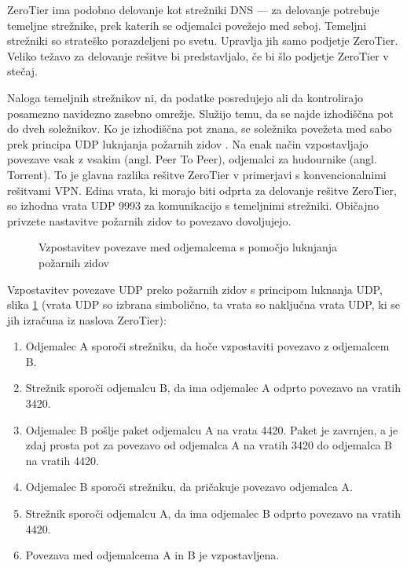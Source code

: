 \documentclass[a4paper, 12pt]{book}
\begin{document}
ZeroTier ima podobno delovanje kot strežniki DNS --- za delovanje potrebuje temeljne strežnike, prek katerih se odjemalci povežejo med seboj. Temeljni strežniki so strateško porazdeljeni po svetu. Upravlja jih samo podjetje \mbox{ZeroTier}. Veliko težavo za delovanje rešitve bi predstavljalo, če bi šlo podjetje \mbox{ZeroTier} v stečaj.  

Naloga temeljnih strežnikov ni, da podatke posredujejo ali da kontrolirajo posamezno navidezno zasebno omrežje. Služijo temu, da se najde izhodiščna pot do dveh soležnikov. Ko je izhodiščna pot znana, se soležnika povežeta med sabo prek principa UDP luknjanja požarnih zidov \cite{scherp_wisent_nodate}. Na enak način vzpostavljajo povezave vsak z vsakim (angl. Peer To Peer), odjemalci za hudournike (angl. Torrent). To je glavna razlika rešitve ZeroTier v primerjavi s konvencionalnimi rešitvami VPN. Edina vrata, ki morajo biti odprta za delovanje rešitve ZeroTier, so izhodna vrata UDP 9993 za komunikacijo s temeljnimi strežniki. Običajno privzete nastavitve požarnih zidov to povezavo dovoljujejo.

\begin{figure}[h]
\begin{center}

\end{center}
\caption{Vzpostavitev povezave med odjemalcema s pomočjo luknjanja požarnih zidov \cite{rvidmar}}
\label{UDP_luknjanje}
\end{figure}

Vzpostavitev povezave UDP preko požarnih zidov s principom luknanja UDP, slika \ref{UDP_luknjanje} \cite{scherp_wisent_nodate} (vrata UDP so izbrana simbolično, ta vrata so naključna vrata UDP, ki se jih izračuna iz naslova ZeroTier):
\begin{enumerate}
  \item Odjemalec A sporoči strežniku, da hoče vzpostaviti povezavo z odjemalcem B.
  \item Strežnik sporoči odjemalcu B, da ima odjemalec A odprto povezavo na vratih 3420.
  \item Odjemalec B pošlje paket odjemalcu A na vrata 4420. Paket je zavrnjen, a je zdaj prosta pot za povezavo od odjemalca A na vratih 3420 do odjemalca B na vratih 4420.
  \item Odjemalec B sporoči strežniku, da pričakuje povezavo odjemalca A.
  \item Strežnik sporoči odjemalcu A, da ima odjemalec B odprto povezavo na vratih 4420.
  \item Povezava med odjemalcema A in B je vzpostavljena.
\end{enumerate}
\end{document}
